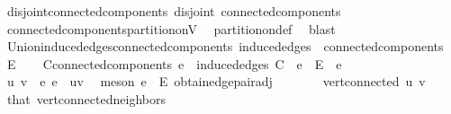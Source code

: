 \begin{isabellebody}
\ disjoint{\isacharunderscore}{\kern0pt}connected{\isacharunderscore}{\kern0pt}components{\isacharcolon}{\kern0pt}\ {\isachardoublequoteopen}disjoint\ connected{\isacharunderscore}{\kern0pt}components{\isachardoublequoteclose}\isanewline
%
\isadelimproof
\ \ %
\endisadelimproof
%
\isatagproof
{}\isamarkupfalse%
\ connected{\isacharunderscore}{\kern0pt}components{\isacharunderscore}{\kern0pt}partition{\isacharunderscore}{\kern0pt}on{\isacharunderscore}{\kern0pt}V\ \isamarkupfalse%
\ partition{\isacharunderscore}{\kern0pt}on{\isacharunderscore}{\kern0pt}def\ \isamarkupfalse%
\ blast%
\endisatagproof
{\isafoldproof}%
%
\isadelimproof
\isanewline
%
\endisadelimproof
\isanewline
{}\isamarkupfalse%
\ Union{\isacharunderscore}{\kern0pt}induced{\isacharunderscore}{\kern0pt}edges{\isacharunderscore}{\kern0pt}connected{\isacharunderscore}{\kern0pt}components{\isacharcolon}{\kern0pt}\ {\isachardoublequoteopen}{\isasymUnion}{\isacharparenleft}{\kern0pt}induced{\isacharunderscore}{\kern0pt}edges\ {\isacharbackquote}{\kern0pt}\ connected{\isacharunderscore}{\kern0pt}components{\isacharparenright}{\kern0pt}\ {\isacharequal}{\kern0pt}\ E{\isachardoublequoteclose}\isanewline
%
\isadelimproof
%
\endisadelimproof
%
\isatagproof
{}\isamarkupfalse%
{\isacharminus}{\kern0pt}\isanewline
\ \ \isamarkupfalse%
\ {\isachardoublequoteopen}{\isasymexists}C{\isasymin}connected{\isacharunderscore}{\kern0pt}components{\isachardot}{\kern0pt}\ e\ {\isasymin}\ induced{\isacharunderscore}{\kern0pt}edges\ C{\isachardoublequoteclose}\ \ {\isachardoublequoteopen}e\ {\isasymin}\ E{\isachardoublequoteclose}\ \ e\isanewline
\ \ \isamarkupfalse%
{\isacharminus}{\kern0pt}\isanewline
\ \ \ \ \isamarkupfalse%
\ u\ v\ \ e{\isacharcolon}{\kern0pt}\ {\isachardoublequoteopen}e\ {\isacharequal}{\kern0pt}\ {\isacharbraceleft}{\kern0pt}u{\isacharcomma}{\kern0pt}v{\isacharbraceright}{\kern0pt}{\isachardoublequoteclose}\ \isamarkupfalse%
\ {\isacharparenleft}{\kern0pt}meson\ {\isacartoucheopen}e\ {\isasymin}\ E{\isacartoucheclose}\ obtain{\isacharunderscore}{\kern0pt}edge{\isacharunderscore}{\kern0pt}pair{\isacharunderscore}{\kern0pt}adj{\isacharparenright}{\kern0pt}\isanewline
\ \ \ \ \isamarkupfalse%
\ \isamarkupfalse%
\ {\isachardoublequoteopen}vert{\isacharunderscore}{\kern0pt}connected\ u\ v{\isachardoublequoteclose}\ \isamarkupfalse%
\ that\ vert{\isacharunderscore}{\kern0pt}connected{\isacharunderscore}{\kern0pt}neighbors\ \isamarkupfalse%

\end{isabellebody}
